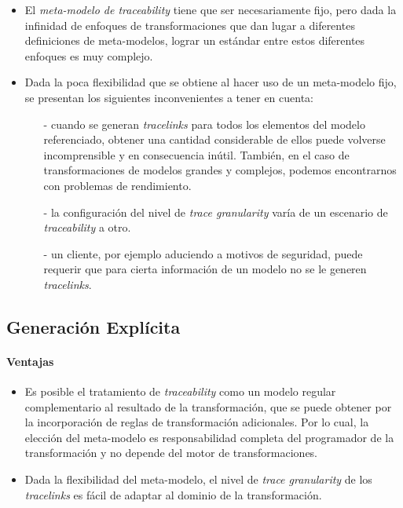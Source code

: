 \documentclass[a4paper,12pt,twoside,spanish,openright]{book}
\begin{document}
\begin{itemize}[label={$\times$}]

\item El \textit{meta-modelo de traceability} tiene que ser necesariamente fijo, pero dada la infinidad de enfoques de transformaciones que dan lugar a diferentes definiciones de meta-modelos, lograr un estándar entre estos diferentes enfoques es muy complejo.

\item Dada la poca flexibilidad que se obtiene al hacer uso de un meta-modelo fijo, se presentan los siguientes inconvenientes a tener en cuenta:

\begin{itemize}

\item[-] cuando se generan \textit{tracelinks} para todos los elementos del modelo referenciado, obtener una cantidad considerable de ellos puede volverse incomprensible y en consecuencia inútil. También, en el caso de transformaciones de modelos grandes y complejos, podemos encontrarnos con problemas de rendimiento.

\item[-] la configuración del nivel de \textit{trace granularity} varía de un escenario de \textit{traceability} a otro.

\item[-] un cliente, por ejemplo aduciendo a motivos de seguridad, puede requerir que para cierta información de un modelo no se le generen \textit{tracelinks}.

\end{itemize}

\end{itemize}

\subsection{Generación Explícita}

\paragraph{Ventajas}

\begin{itemize}[label={\checkmark}]

\item Es posible el tratamiento de \textit{traceability} como un modelo regular complementario al resultado de la transformación, que se puede obtener por la incorporación de reglas de transformación adicionales. Por lo cual, la elección del meta-modelo es responsabilidad completa del programador de la transformación y no depende del motor de transformaciones. 

\item Dada la flexibilidad del meta-modelo, el nivel de \textit{trace granularity} de los \textit{tracelinks} es fácil de adaptar al dominio de la transformación.

\end{itemize}
\end{document}
